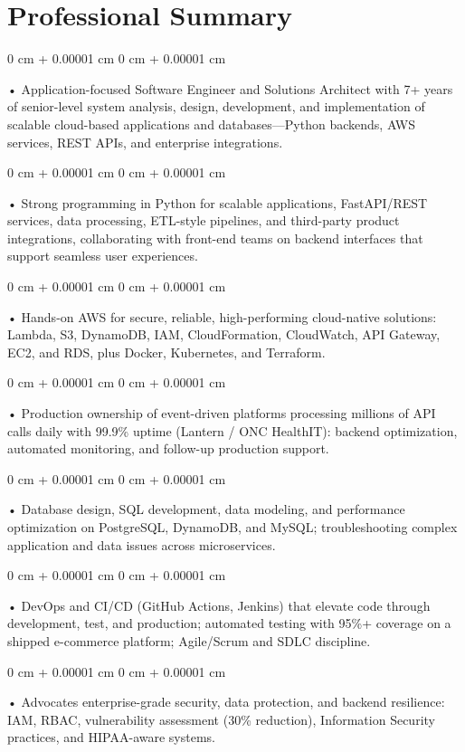 \documentclass[10pt, letterpaper]{article}
\newenvironment{onecolentry}{
    \begin{adjustwidth}{
        0 cm + 0.00001 cm
    }{
        0 cm + 0.00001 cm
    }
}{
    \end{adjustwidth}
} %
\begin{document}
    \section{Professional Summary}
        \vspace{2 pt }
        \begin{onecolentry}
            • Application-focused Software Engineer and Solutions Architect with 7+ years of senior-level system analysis, design, development, and implementation of scalable cloud-based applications and databases---Python backends, AWS services, REST APIs, and enterprise integrations.
        \end{onecolentry}
        \begin{onecolentry}
            • Strong programming in Python for scalable applications, FastAPI/REST services, data processing, ETL-style pipelines, and third-party product integrations, collaborating with front-end teams on backend interfaces that support seamless user experiences.
        \end{onecolentry}
        \begin{onecolentry}
            • Hands-on AWS for secure, reliable, high-performing cloud-native solutions: Lambda, S3, DynamoDB, IAM, CloudFormation, CloudWatch, API Gateway, EC2, and RDS, plus Docker, Kubernetes, and Terraform.
        \end{onecolentry}
        \begin{onecolentry}
            • Production ownership of event-driven platforms processing millions of API calls daily with 99.9\% uptime (Lantern / ONC HealthIT): backend optimization, automated monitoring, and follow-up production support.
        \end{onecolentry}
        \begin{onecolentry}
            • Database design, SQL development, data modeling, and performance optimization on PostgreSQL, DynamoDB, and MySQL; troubleshooting complex application and data issues across microservices.
        \end{onecolentry}
        \begin{onecolentry}
            • DevOps and CI/CD (GitHub Actions, Jenkins) that elevate code through development, test, and production; automated testing with 95\%+ coverage on a shipped e-commerce platform; Agile/Scrum and SDLC discipline.
        \end{onecolentry}
        \begin{onecolentry}
            • Advocates enterprise-grade security, data protection, and backend resilience: IAM, RBAC, vulnerability assessment (30\% reduction), Information Security practices, and HIPAA-aware systems.
        \end{onecolentry}
\end{document}
